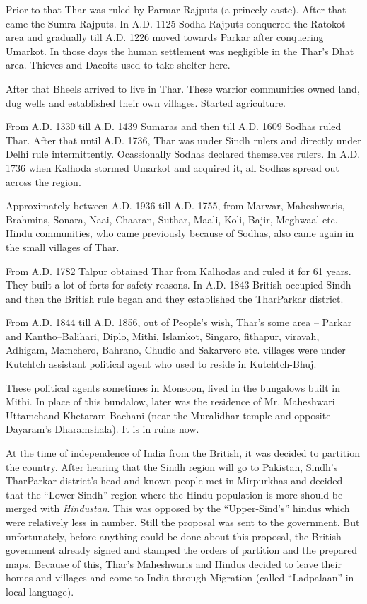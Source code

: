 Prior to that Thar was ruled by Parmar Rajputs (a princely caste). After that came the Sumra Rajputs. In A.D. 1125 Sodha Rajputs conquered the Ratokot area and gradually till A.D. 1226 moved towards Parkar after conquering Umarkot. In those days the human settlement was negligible in the Thar's Dhat area. Thieves and Dacoits used to take shelter here.

After that Bheels arrived to live in Thar. These warrior communities owned land, dug wells and established their own villages. Started agriculture.

From A.D. 1330 till A.D. 1439 Sumaras and then till A.D. 1609 Sodhas ruled Thar. After that until A.D. 1736, Thar was under Sindh rulers and directly under Delhi rule intermittently. Ocassionally Sodhas declared themselves rulers. In A.D. 1736 when Kalhoda stormed Umarkot and acquired it, all Sodhas spread out across the region.

Approximately between A.D. 1936 till A.D. 1755, from Marwar, Maheshwaris, Brahmins, Sonara, Naai, Chaaran, Suthar, Maali, Koli, Bajir, Meghwaal etc. Hindu communities, who came previously because of Sodhas, also came again in the small villages of Thar.

From A.D. 1782 Talpur obtained Thar from Kalhodas and ruled it for 61 years. They built a lot of forts for safety reasons. In A.D. 1843 British occupied Sindh and then the British rule began and they established the TharParkar district.

From A.D. 1844 till A.D. 1856, out of People's wish, Thar's some area -- Parkar and Kantho--Balihari, Diplo, Mithi, Islamkot, Singaro, fithapur, viravah, Adhigam, Mamchero, Bahrano, Chudio and Sakarvero etc. villages were under Kutchtch assistant political agent who used to reside in Kutchtch-Bhuj.

These political agents sometimes in Monsoon, lived in the bungalows built in Mithi. In place of this bundalow, later was the residence of Mr. Maheshwari Uttamchand Khetaram Bachani (near the Muralidhar temple and opposite Dayaram's Dharamshala). It is in ruins now.

At the time of independence of India from the British, it was decided to partition the country. After hearing that the Sindh region will go to Pakistan, Sindh's TharParkar district's head and known people met in  Mirpurkhas and decided that the ``Lower-Sindh'' region where the Hindu population is more should be merged with \textit{Hindustan}. This was opposed by the ``Upper-Sind's'' hindus which were relatively less in number. Still the proposal was sent to the government. But unfortunately, before anything could be done about this proposal, the British government already signed and stamped the orders of partition and the prepared maps. Because of this, Thar's Maheshwaris and Hindus decided to leave their homes and villages and come to India through Migration (called ``Ladpalaan'' in local language).


